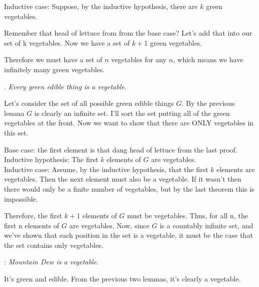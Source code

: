 \documentclass[basic, header]{nosvagor-notes}
\begin{document}
\begin{enumerate}[itemsep=4em]
    Inductive case: Suppose, by the inductive hypothesis, there are \(k\) green vegetables.

    Remember that head of lettuce from from the base case? Let’s add that into our set of k vegetables.
    Now we have a set of \(k + 1\) green vegetables.

    Therefore we must have a set of \(n\) vegetables for any \(n\), which means
    we have infinitely many green vegetables. \tqed

    . \textit{Every green edible thing is a vegetable}.


    Let’s consider the set of all possible green edible things \(G\). By the
    previous lemma \(G\) is clearly an infinite set. I’ll sort the set putting all
    of the green vegetables at the front. Now we want to show that there are
    ONLY vegetables in this set.\\

    Base case: the first element is that dang head of lettuce from the last
    proof.\\ Inductive hypothesis: The first \(k\) elements of \(G\) are vegetables.\\
    Inductive case: Assume, by the inductive hypothesis, that the first \(k\)
    elements are vegetables. Then the next element must also be a vegetable. If
    it wasn't then there would only be a finite number of vegetables, but by
    the last theorem this is impossible.

    Therefore, the first \(k+1\) elements of \(G\) must be vegetables. Thus, for all
    n, the first n elements of \(G\) are vegetables. Now, since \(G\) is a countably
    infinite set, and we've shown that each position in the set is a vegetable,
    it must be the case that the set contains only vegetables.

    : \textit{Mountain Dew is a vegetable}.


    It’s green and edible. From the previous two lemmas, it’s clearly a vegetable. \tqed

\end{enumerate}
\end{document}
